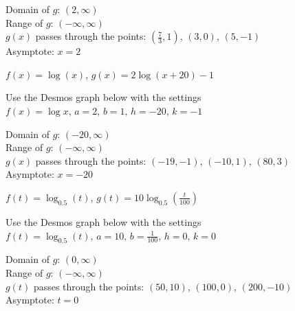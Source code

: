 \documentclass{ximera}
\begin{document}
\begin{question}
\begin{problem}
\begin{solution}
\begin{center} 
\end{center}

Domain of $g$: $(2, \infty)$\\
 Range of $g$:  $(-\infty, \infty)$ \\
 $g(x)$ passes through the points:  $\left( \frac{7}{3},1 \right)$, $(3,0)$, $(5,-1)$ \\
 Asymptote: $x = 2$ \\
\end{solution}
\end{problem}

\begin{problem}
$f(x) = \log(x)$, $g(x) = 2\log(x+20) -1$ 

\begin{solution}
Use the Desmos graph below with the settings $f(x)=\log x,\,a=2,\,b=1,\,h=-20,\,k=-1$

\begin{center} 
\end{center}

Domain of $g$: $(-20, \infty)$\\
 Range of $g$:  $(-\infty, \infty)$\\
 $g(x)$ passes through the points:  $(-19, -1)$, $(-10,1)$, $(80,3)$\\
 Asymptote:  $x = -20$ \\
\end{solution}
\end{problem}

\begin{problem}
$f(t) = \log_{0.5}(t)$, $g(t) = 10 \log_{0.5}\left(\frac{t}{100}\right)$

\begin{solution}
Use the Desmos graph below with the settings $f(t) = \log_{0.5}(t),\,a=10,\,b=\frac{1}{100},\,h=0,\,k=0$

\begin{center} 
\end{center}

Domain of $g$: $(0, \infty)$ \\
  Range of $g$:  $(-\infty, \infty)$ \\
 $g(t)$ passes through the points:  $(50,10)$,   $(100,0)$, $(200,-10)$  \\
  Asymptote: $t= 0$\\
\end{solution}
\end{problem}


\end{question}
\end{document}
